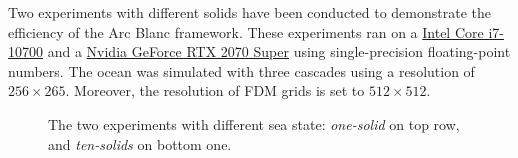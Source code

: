 \documentclass[final]{jcgt}
\def\framework{the Arc Blanc framework\xspace}
\begin{document}
Two experiments with different solids have been conducted to demonstrate the efficiency of \framework.
These experiments ran on a \href{https://www.intel.fr/content/www/fr/fr/products/sku/199316/intel-core-i710700-processor-16m-cache-up-to-4-80-ghz/specifications.html}{Intel Core i7-10700} and a \href{https://www.nvidia.com/fr-fr/geforce/graphics-cards/compare/?section=compare-20}{Nvidia GeForce RTX 2070 Super} using single-precision floating-point numbers.
The ocean was simulated with three cascades using a resolution of $256\times265$.
Moreover, the resolution of FDM grids is set to $512\times 512$. 
\begin{figure}[htbp]
	\centering

	\hspace{1cm}
    \vspace{1cm}
	\hspace{1cm}
	\caption{The two experiments with different sea state: \emph{one-solid} on top row, and \emph{ten-solids} on bottom one.}
	\label{fig:experiments}
\end{figure}
\end{document}
